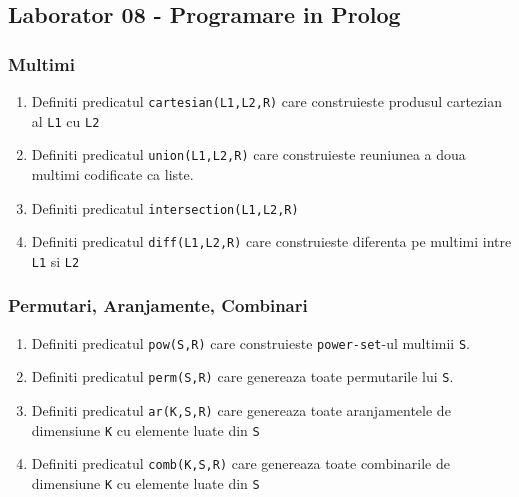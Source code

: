 \subsection*{ Laborator 08 - Programare in Prolog }

\subsubsection*{ Multimi }
\begin{enumerate}
	\item  Definiti predicatul \texttt{cartesian(L1,L2,R)} care construieste produsul cartezian al \texttt{L1} cu \texttt{L2}
	\item  Definiti predicatul \texttt{union(L1,L2,R)} care construieste reuniunea a doua multimi codificate ca liste.
	\item  Definiti predicatul \texttt{intersection(L1,L2,R)}
	\item  Definiti predicatul \texttt{diff(L1,L2,R)} care construieste diferenta pe multimi intre \texttt{L1} si \texttt{L2}
\end{enumerate}

\subsubsection*{ Permutari, Aranjamente, Combinari }
\begin{enumerate}
	\item  Definiti predicatul \texttt{pow(S,R)} care construieste \texttt{power-set}-ul multimii \texttt{S}.
	\item  Definiti predicatul \texttt{perm(S,R)} care genereaza toate permutarile lui \texttt{S}.
	\item  Definiti predicatul \texttt{ar(K,S,R)} care genereaza toate aranjamentele de dimensiune \texttt{K} cu elemente luate din \texttt{S}
	\item  Definiti predicatul \texttt{comb(K,S,R)} care genereaza toate combinarile de dimensiune \texttt{K} cu elemente luate din \texttt{S}
\end{enumerate}
